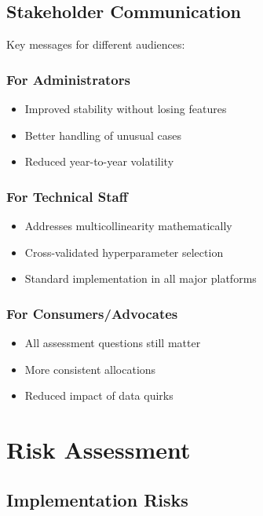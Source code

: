 \subsection{Stakeholder Communication}

Key messages for different audiences:

\subsubsection{For Administrators}
\begin{itemize}
    \item Improved stability without losing features
    \item Better handling of unusual cases
    \item Reduced year-to-year volatility
\end{itemize}

\subsubsection{For Technical Staff}
\begin{itemize}
    \item Addresses multicollinearity mathematically
    \item Cross-validated hyperparameter selection
    \item Standard implementation in all major platforms
\end{itemize}

\subsubsection{For Consumers/Advocates}
\begin{itemize}
    \item All assessment questions still matter
    \item More consistent allocations
    \item Reduced impact of data quirks
\end{itemize}

\section{Risk Assessment}

\subsection{Implementation Risks}

